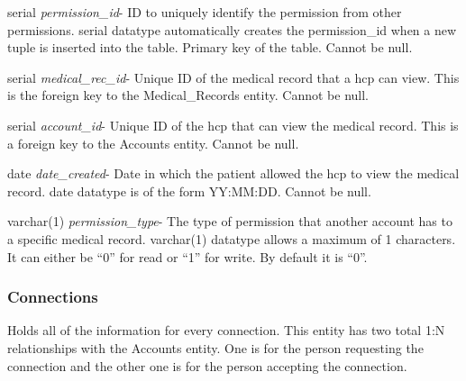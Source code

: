 \begin{description}
\item serial \textit{permission\_id}-  ID to uniquely identify the permission from other permissions. serial datatype automatically creates the permission\_id when a new tuple is inserted into the table.  Primary key of the table.  Cannot be null.
\item serial \textit{medical\_rec\_id}- Unique ID of the medical record that a hcp can view.  This is the foreign key to the Medical\_Records entity.  Cannot be null.
\item serial \textit{account\_id}- Unique ID of the hcp that can view the medical record.  This is a foreign key to the Accounts entity.  Cannot be null.
\item date \textit{date\_created}-  Date in which the patient allowed the hcp to view the medical record.  date datatype is of the form YY:MM:DD.  Cannot be null.
\item varchar(1) \textit{permission\_type}- The type of permission that another account has to a specific medical record.  varchar(1) datatype allows a maximum of 1 characters.  It can either be ``0'' for read or ``1'' for write.  By default it is ``0''.
\end{description}


\subsubsection{Connections}
Holds all of the information for every connection.  This entity has two total 1:N relationships with the Accounts entity.  One is for the person requesting the connection and the other one is for the person accepting the connection.

